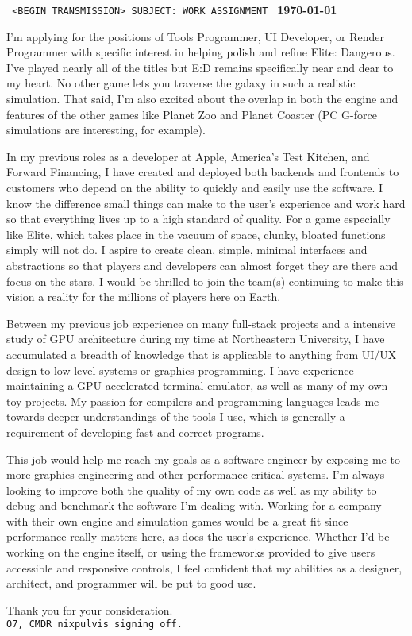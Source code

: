 

\addtolength{\oddsidemargin}{1in}
\addtolength{\evensidemargin}{1in}
\addtolength{\textwidth}{-2in}
\linespread{1.5}




\vspace{3em}

\noindent \texttt{
<BEGIN TRANSMISSION>
SUBJECT: WORK ASSIGNMENT
}
\hfill
{\bf\today}
\vspace{1em}

I'm applying for the positions of Tools Programmer, UI Developer, or Render
Programmer with specific interest in helping polish and refine Elite:
Dangerous. I've played nearly all of the titles but E:D remains specifically
near and dear to my heart. No other game lets you traverse the galaxy in such a
realistic simulation. That said, I'm also excited about the overlap in both the
engine and features of the other games like Planet Zoo and Planet Coaster (PC
G-force simulations are interesting, for example).

In my previous roles as a developer at Apple, America's Test Kitchen, and
Forward Financing, I have created and deployed both backends and frontends to
customers who depend on the ability to quickly and easily use the software. I
know the difference small things can make to the user's experience and work
hard so that everything lives up to a high standard of quality. For a game
especially like Elite, which takes place in the vacuum of space, clunky,
bloated functions simply will not do. I aspire to create clean, simple, minimal
interfaces and abstractions so that players and developers can almost forget
they are there and focus on the stars. I would be thrilled to join the team(s)
continuing to make this vision a reality for the millions of players here on
Earth.

Between my previous job experience on many full-stack projects and a intensive
study of GPU architecture during my time at Northeastern University, I have
accumulated a breadth of knowledge that is applicable to anything from UI/UX
design to low level systems or graphics programming. I have experience
maintaining a GPU accelerated terminal emulator, as well as many of my own toy
projects. My passion for compilers and programming languages leads me towards
deeper understandings of the tools I use, which is generally a requirement of
developing fast and correct programs.

This job would help me reach my goals as a software engineer by exposing me to
more graphics engineering and other performance critical systems. I'm always
looking to improve both the quality of my own code as well as my ability to
debug and benchmark the software I'm dealing with. Working for a company with
their own engine and simulation games would be a great fit since performance
really matters here, as does the user's experience. Whether I'd be working on
the engine itself, or using the frameworks provided to give users accessible
and responsive controls, I feel confident that my abilities as a designer,
architect, and programmer will be put to good use.

\vspace{1.5em}
\noindent Thank you for your consideration.\\
\noindent \texttt{O7, CMDR nixpulvis signing off.}


